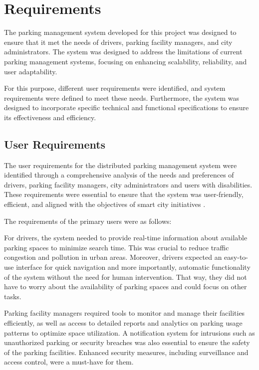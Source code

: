 \chapter{Requirements}\label{ch:requirements}


The parking management system developed for this project was designed to ensure that it met the needs of drivers, parking facility managers, and city administrators.
The system was designed to address the limitations of current parking management systems, focusing on enhancing scalability, reliability, and user adaptability.

For this purpose, different user requirements were identified, and system requirements were defined to meet these needs.
Furthermore, the system was designed to incorporate specific technical and functional specifications to ensure its effectiveness and efficiency.

\section{User Requirements}\label{sec:user_requirements}

The user requirements for the distributed parking management system were identified through a comprehensive analysis of the needs and preferences of drivers, parking facility managers, city administrators and users with disabilities.
These requirements were essential to ensure that the system was user-friendly, efficient, and aligned with the objectives of smart city initiatives \autocite{smart_cities_initiatives}.

The requirements of the primary users were as follows:

For drivers, the system needed to provide real-time information about available parking spaces to minimize search time.
This was crucial to reduce traffic congestion and pollution in urban areas.
Moreover, drivers expected an easy-to-use interface for quick navigation and more importantly, automatic functionality of the system without the need for human intervention.
That way, they did not have to worry about the availability of parking spaces and could focus on other tasks.

Parking facility managers required tools to monitor and manage their facilities efficiently, as well as access to detailed reports and analytics on parking usage patterns to optimize space utilization.
A notification system for intrusions such as unauthorized parking or security breaches was also essential to ensure the safety of the parking facilities.
Enhanced security measures, including surveillance and access control, were a must-have for them.

